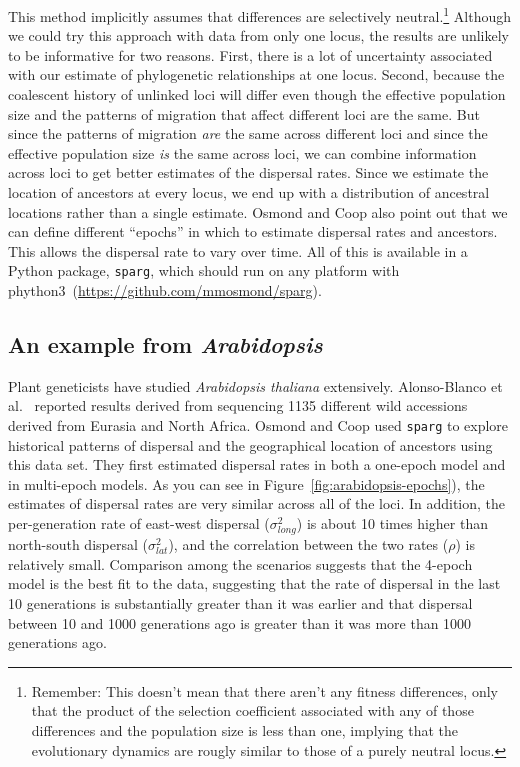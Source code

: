 \documentclass[12pt]{article}
\begin{document}
This method implicitly assumes that differences are selectively
neutral.\footnote{Remember: This doesn't mean that there aren't any
  fitness differences, only that the product of the selection
  coefficient associated with any of those differences and the
  population size is less than one, implying that the evolutionary
  dynamics are rougly similar to those of a purely neutral locus.}
Although we could try this approach with data from only one locus, the
results are unlikely to be informative for two reasons. First, there
is a lot of uncertainty associated with our estimate of phylogenetic
relationships at one locus. Second, because the coalescent history of
unlinked loci will differ even though the effective population size
and the patterns of migration that affect different loci are the
same. But since the patterns of migration {\it are\/} the same across
different loci and since the effective population size {\it is\/} the
same across loci, we can combine information across loci to get better
estimates of the dispersal rates. Since we estimate the location of
ancestors at every locus, we end up with a distribution of ancestral
locations rather than a single estimate. Osmond and Coop also point
out that we can define different ``epochs'' in which to estimate
dispersal rates and ancestors. This allows the dispersal rate to vary
over time. All of this is available in a Python package, {\tt sparg},
which should run on any platform with
phython3~(\url{https://github.com/mmosmond/sparg}).

\subsection*{An example from {\it Arabidopsis}} 

Plant geneticists have studied {\it Arabidopsis thaliana\/}
extensively. Alonso-Blanco et al.~\cite{AlonsoBlanco-etal-2016}
reported results derived from sequencing 1135 different wild
accessions derived from Eurasia and North Africa. Osmond and Coop used
{\tt sparg} to explore historical patterns of dispersal and the
geographical location of ancestors using this data set. They first
estimated dispersal rates in both a one-epoch model and in multi-epoch
models. As you can see in Figure~\ref{fig:arabidopsis-epochs}), the
estimates of dispersal rates are very similar across all of the
loci. In addition, the per-generation rate of east-west dispersal
($\sigma^2_{long}$) is about 10 times higher than north-south
dispersal ($\sigma^2_{lat}$), and the correlation between the two
rates ($\rho$) is relatively small. Comparison among the scenarios
suggests that the 4-epoch model is the best fit to the data,
suggesting that the rate of dispersal in the last 10 generations is
substantially greater than it was earlier and that dispersal between
10 and 1000 generations ago is greater than it was more than 1000
generations ago.
\end{document}
